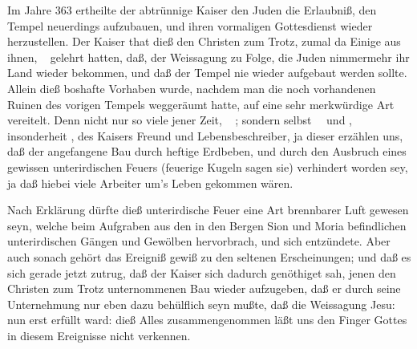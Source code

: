 \begin{aufza}
\item Im Jahre 363 ertheilte der abtrünnige Kaiser  den Juden die Erlaubniß, den Tempel neuerdings aufzubauen, und ihren vormaligen Gottesdienst wieder herzustellen. Der Kaiser that dieß den Christen zum Trotz, zumal da Einige aus ihnen, \zB\  gelehrt hatten, daß, der Weissagung  zu Folge, die Juden nimmermehr ihr Land wieder bekommen, und daß der Tempel nie wieder aufgebaut werden sollte. Allein dieß boshafte Vorhaben wurde, nachdem man die noch vorhandenen Ruinen des vorigen Tempels weggeräumt hatte, auf eine sehr merkwürdige Art vereitelt. Denn nicht nur so viele  jener Zeit, \zB\  \uA ; sondern selbst~\  und , insonderheit , des Kaisers  Freund und Lebensbeschreiber, ja dieser  erzählen uns, daß der angefangene Bau durch heftige Erdbeben, und durch den Ausbruch eines gewissen unterirdischen Feuers (feuerige Kugeln sagen sie) verhindert worden sey, ja daß hiebei viele Arbeiter um's Leben gekommen wären.
\item Nach  Erklärung dürfte dieß unterirdische Feuer eine Art brennbarer Luft gewesen seyn, welche beim Aufgraben aus den in den Bergen Sion und Moria befindlichen unterirdischen Gängen und Gewölben hervorbrach, und sich entzündete. Aber auch sonach gehört das Ereigniß gewiß zu den seltenen Erscheinungen; und daß es sich gerade jetzt zutrug, daß der Kaiser sich dadurch genöthiget sah, jenen den Christen zum Trotz unternommenen Bau wieder aufzugeben, daß er durch seine Unternehmung nur eben dazu behülflich seyn mußte, daß die Weissagung Jesu:  nun erst  erfüllt ward: dieß Alles zusammengenommen läßt uns den Finger Gottes in diesem Ereignisse nicht verkennen.
\end{aufza}

